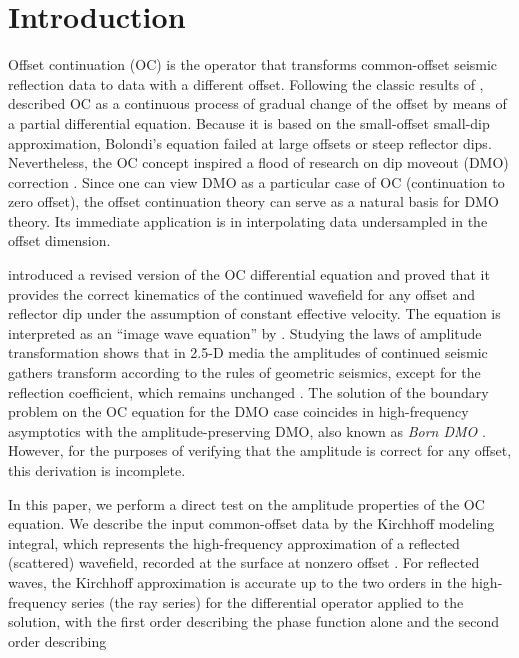 \section{Introduction}
Offset continuation (OC) is the operator that transforms common-offset
seismic reflection data to data with a different offset. Following the
classic results of \cite{GPR29-03-03740406},
\cite{GPR30-06-08130828,GPR32-06-10451073} described OC as a
continuous process of gradual change of the offset by means of a
partial differential equation. Because it is based on the small-offset
small-dip approximation, Bolondi's equation failed at large offsets or
steep reflector dips. Nevertheless, the OC concept inspired a flood of
research on dip moveout (DMO) correction
\cite[]{DMP00-00-01300130}. Since one can view DMO as a particular
case of OC (continuation to zero offset), the offset continuation
theory can serve as a natural basis for DMO theory. Its immediate
application is in interpolating data undersampled in the offset
dimension.  \par \cite{me,GEO68-02-07180732} introduced a
revised version of the OC differential equation and proved that it
provides the correct kinematics of the continued wavefield for any
offset and reflector dip under the assumption of constant effective
velocity. The equation is interpreted as an ``image wave equation'' by
\cite{hubral}.  Studying the laws of amplitude transformation shows
that in 2.5-D media the amplitudes of continued seismic gathers
transform according to the rules of geometric seismics, except for the
reflection coefficient, which remains unchanged
\cite[]{joint,GEO68-02-07180732}. The solution of the boundary problem
on the OC equation for the DMO case \cite[]{GEO68-02-07180732}
coincides in high-frequency asymptotics with the amplitude-preserving
DMO, also known as {\em Born DMO}
\cite[]{GEO56-02-01820189,SEG-1990-1366}.  However, for the purposes
of verifying that the amplitude is correct for any offset, this
derivation is incomplete.  \par In this paper, we perform a direct
test on the amplitude properties of the OC equation.  We describe the
input common-offset data by the Kirchhoff modeling integral, which
represents the high-frequency approximation of a reflected (scattered)
wavefield, recorded at the surface at nonzero offset \cite[]{norm}.
For reflected waves, the Kirchhoff approximation is accurate up to the
two orders in the high-frequency series (the ray series) for the
differential operator applied to the solution, with the first order
describing the phase function alone and the second order describing
